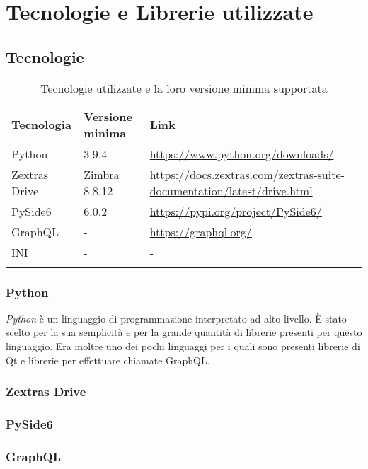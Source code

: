 \section{Tecnologie e Librerie utilizzate}

\subsection{Tecnologie}
{
	\setlength{\freewidth}{\dimexpr\textwidth-1\tabcolsep}
	\renewcommand{\arraystretch}{1.5}
	\setlength{\aboverulesep}{0pt}
	\setlength{\belowrulesep}{0pt}
	\begin{longtable}{L{.15\freewidth} L{.20\freewidth} L{.60\freewidth}}
		\textbf{Tecnologia} & \textbf{Versione minima} & \textbf{Link}\\
		\toprule
		\endhead	
		Python & 3.9.4 & \url{https://www.python.org/downloads/}\\
		Zextras Drive & Zimbra 8.8.12 &  \url{https://docs.zextras.com/zextras-suite-documentation/latest/drive.html}\\	
		PySide6 & 6.0.2 & \url{https://pypi.org/project/PySide6/}\\
		GraphQL & - & \url{https://graphql.org/} \\
		INI & - & -\\
		\bottomrule
		\hiderowcolors
		\caption{Tecnologie utilizzate e la loro versione minima supportata}
	\end{longtable}
\subsubsection{Python}
\textit{Python} è un linguaggio di programmazione interpretato ad alto livello. È stato scelto per la sua semplicità e per la grande quantità di librerie presenti per questo linguaggio. Era inoltre uno dei pochi linguaggi per i quali sono presenti librerie di Qt e librerie per effettuare chiamate GraphQL.
\subsubsection{Zextras Drive}

\subsubsection{PySide6}

\subsubsection{GraphQL}

}
